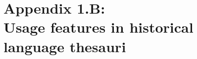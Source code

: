 \endgroup



\newpage
\section*{Appendix 1.B:\\Usage features in historical language thesauri}
\label{Appendix1.B}
\begingroup
\renewcommand{\thefigure}{1.B.\arabic{figure}}
\setcounter{figure}{0}
\renewcommand{\thetable}{1.B.\arabic{table}}
\setcounter{table}{0}

